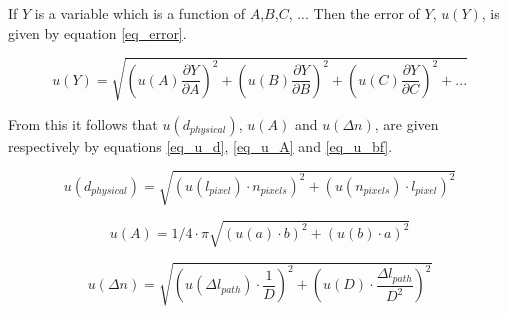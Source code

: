 If $Y$ is a variable which is a function of $A$,$B$,$C$, ... Then the error of $Y$, $u(Y)$, is given by equation \ref{eq_error}.

\begin{equation}
	\label{eq_error}
	u(Y) = \sqrt{\left(u(A) \frac{\partial Y}{\partial A}\right)^2 + \left(u(B) \frac{\partial Y}{\partial B}\right)^2 + \left(u(C) \frac{\partial Y}{\partial C}\right)^2 + ...}
\end{equation}

From this it follows that $u(d_{physical})$, $u(A)$ and $u(\Delta n)$, are given respectively by equations \ref{eq_u_d}, \ref{eq_u_A} and \ref{eq_u_bf}.

\begin{equation}
	\label{eq_u_distance}
	u(d_{physical}) = \sqrt{\left( u(l_{pixel}) \cdot n_{pixels} \right)^2 + \left( u(n_{pixels}) \cdot l_{pixel} \right)^2}
\end{equation}

\begin{equation}
	\label{eq_u_ellipse}
	u(A) = 1/4 \cdot \pi  \sqrt{(u(a) \cdot b)^2 + (u(b) \cdot a)^2}
\end{equation}

\begin{equation}
	\label{eq_u_bf}
	u(\Delta n) = \sqrt{\left( u(\Delta l_{path}) \cdot \frac{1}{D}\right)^2 + \left( u(D) \cdot \frac{\Delta l_{path}}{D^2}\right)^2}
\end{equation}

